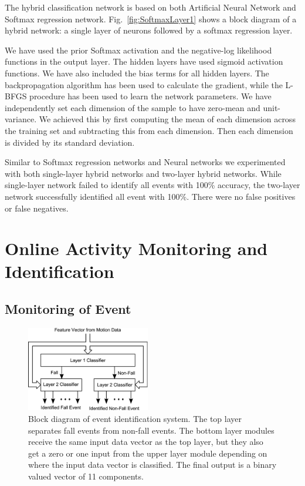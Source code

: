 \documentclass{IEEEtran}
\begin{document}
The hybrid classification network is based on both Artificial Neural Network  and Softmax regression network. Fig.~\ref{fig:SoftmaxLayer1} shows a block diagram of a hybrid network: a single layer of neurons followed by a softmax regression layer.
\par
We have used the prior Softmax activation  and the negative-log likelihood 
functions in the output layer. The hidden layers have used sigmoid activation functions. 
We have also included the bias terms for all hidden layers. The backpropagation algorithm 
has been used to calculate the gradient, while the L-BFGS procedure has been used to 
learn the network parameters. We have independently set each dimension of the sample to 
have zero-mean and unit-variance. We achieved this by first computing the mean of each 
dimension across the training set and subtracting this from each dimension. Then each 
dimension is divided by its standard deviation.       

Similar to Softmax regression networks and Neural networks we experimented  with both single-layer hybrid networks and two-layer hybrid networks. While single-layer network failed to identify all events with 100\% accuracy, the two-layer network successfully identified all event with 100\%. There were no false positives or false negatives.

\section{Online Activity Monitoring and Identification}



\subsection{Monitoring of Event}

\begin{figure}[htbp]
	\centering
		\includegraphics[width=0.48\textwidth]{figures/TrainedIdentificationModule.eps}
	\caption{Block diagram of event identification system. The top layer separates fall events from non-fall events. The bottom layer modules receive the same input data vector as the top layer, but they also get a zero or one input from the upper layer module depending on where the input data vector is classified. The final output is a binary valued vector of 11 components.}
	\label{fig:TrainedIdentificationModule}
\end{figure}
\end{document}
